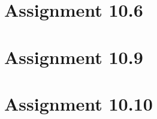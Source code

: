\documentclass[10pt,a4paper,final,oneside,openany,article]{memoir}
\begin{document}
\chapter*{Assignment 10.6}

\chapter*{Assignment 10.9}

\chapter*{Assignment 10.10}
\end{document}
